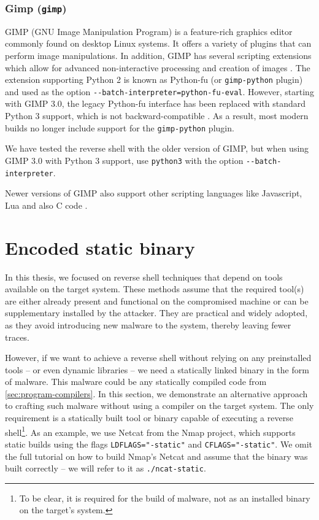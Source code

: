 \subsubsection{Gimp (\texttt{gimp})}


GIMP (GNU Image Manipulation Program) is a feature-rich graphics editor commonly found on desktop Linux systems. It offers a variety of plugins that can perform image manipulations. In addition, GIMP has several scripting extensions which allow for advanced non-interactive processing and creation of images \cite{gimp-man}. The extension supporting Python 2 is known as Python-fu (or \texttt{gimp-python} plugin) and used as the option \texttt{-{}-batch-interpreter=python-fu-eval}. However, starting with GIMP 3.0, the legacy Python-fu interface has been replaced with standard Python 3 support, which is not backward-compatible \cite{gimp-3}. As a result, most modern builds no longer include support for the \texttt{gimp-python} plugin.

We have tested the reverse shell with the older version of GIMP, but when using GIMP 3.0 with Python 3 support, use \texttt{python3} with the option \texttt{-{}-batch-interpreter}.


Newer versions of GIMP also support other scripting languages like Javascript, Lua and also C code \cite{gimp-3}.


\section{Encoded static binary}

In this thesis, we focused on reverse shell techniques that depend on tools available on the target system. These methods assume that the required tool(s) are either already present and functional on the compromised machine or can be supplementary installed by the attacker. They are practical and widely adopted, as they avoid introducing new malware to the system, thereby leaving fewer traces.

However, if we want to achieve a reverse shell without relying on any preinstalled tools -- or even dynamic libraries -- we need a statically linked binary in the form of malware. This malware could be any statically compiled code from \cref{sec:program-compilers}. In this section, we demonstrate an alternative approach to crafting such malware without using a compiler on the target system. The only requirement is a statically built tool or binary capable of executing a reverse shell\footnote{To be clear, it is required for the build of malware, not as an installed binary on the target's system.}. As an example, we use Netcat from the Nmap project, which supports static builds using the flags \texttt{LDFLAGS="-static"} and \texttt{CFLAGS="-static"}. We omit the full tutorial on how to build Nmap's Netcat and assume that the binary was built correctly -- we will refer to it as \texttt{./ncat-static}.

